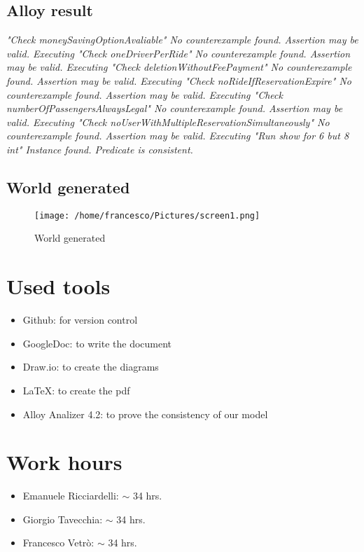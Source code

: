 \documentclass[10pt, a4paper,titlepage]{article}
\begin{document}
\subsection{Alloy result}
\textit{
"Check moneySavingOptionAvaliable"
No counterexample found. Assertion may be valid.
\newline
\newline
Executing "Check oneDriverPerRide"
No counterexample found. Assertion may be valid.
\newline
\newline
Executing "Check deletionWithoutFeePayment"
No counterexample found. Assertion may be valid.
\newline
\newline
Executing "Check noRideIfReservationExpire"
No counterexample found. Assertion may be valid.
\newline
\newline
Executing "Check numberOfPassengersAlwaysLegal"
No counterexample found. Assertion may be valid.
\newline
\newline
Executing "Check noUserWithMultipleReservationSimultaneously"
No counterexample found. Assertion may be valid.
\newline
\newline
Executing "Run show for 6 but 8 int"
Instance found. Predicate is consistent.
}
\clearpage
\subsection{World generated}
\begin{figure}[!b]
\texttt{[image: /home/francesco/Pictures/screen1.png]}
\caption{World generated}
\label{fig:World generated}
\end{figure}
\clearpage
{}
\section*{Used tools}
\begin{itemize}
\item Github: for version control
\item GoogleDoc: to write the document
\item Draw.io: to create the diagrams
\item \LaTeX: to create the pdf
\item Alloy Analizer 4.2: to prove the consistency of our model 
\end{itemize}
\section*{Work hours} 
\begin{itemize}
\item Emanuele Ricciardelli: $\sim$ 34 hrs.
\item Giorgio Tavecchia: $\sim$ 34 hrs.
\item Francesco Vetrò: $\sim$ 34 hrs.
\end{itemize}
\end{document}
